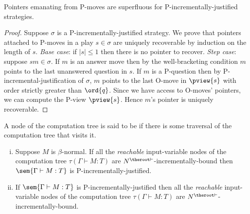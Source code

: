 \begin{lemma}
\label{lem:incrjustified_pointers_uniqu_recover} Pointers emanating
from P-moves are superfluous for P-incrementally-justified
strategies.
\end{lemma}
\begin{proof}
Suppose $\sigma$ is a P-incrementally-justified strategy. We prove
that pointers attached to P-moves in a play $s\in \sigma$ are
uniquely recoverable by induction on the length of $s$. \noindent
\emph{Base case}: if $|s| \leq 1$ then there is no pointer to
recover. \noindent \emph{Step case}: suppose $s m \in \sigma$. If
$m$ is an answer move then by the well-bracketing condition $m$
points to the last unanswered question in $s$. If $m$ is a
P-question then by  P-incremental-justification of $\sigma$, $m$
points to the last O-move in $\pview{s}$ with order strictly greater
than $\ord{q}$. Since we have access to O-moves' pointers, we can
compute the P-view $\pview{s}$. Hence $m$'s pointer is uniquely
recoverable.
\end{proof}





A node of the computation tree is said to be  if
there is some traversal of the computation tree that visits it.

\begin{proposition}
\hfill

 \label{prop:Nher_incrbound_iff_incrjustified}

\begin{enumerate}[(i)]
\item Suppose $M$ is $\beta$-normal. If all the \emph{reachable} input-variable nodes of the computation tree
$\tau(\Gamma \vdash M : T)$ are
$N^{\theroot\vdash}$-incrementally-bound then $\sem{\Gamma
\vdash M : T}$ is P-incrementally-justified.

\item If $\sem{\Gamma \vdash M : T}$ is
P-incrementally-justified then all the \emph{reachable}
input-variable nodes of the computation tree $\tau(\Gamma \vdash
M : T)$ are $N^{\theroot\vdash}$-incrementally-bound.
\end{enumerate}
\end{proposition}

